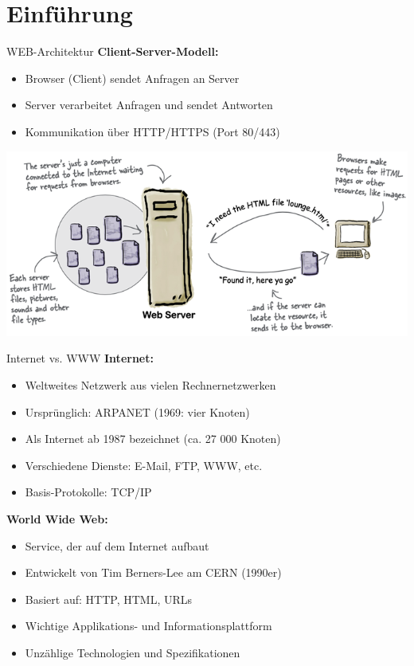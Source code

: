 \section{Einführung}

\begin{definition}{WEB-Architektur}
    \textbf{Client-Server-Modell:}
    \begin{itemize}
        \item Browser (Client) sendet Anfragen an Server
        \item Server verarbeitet Anfragen und sendet Antworten
        \item Kommunikation über HTTP/HTTPS (Port 80/443)
    \end{itemize}
    \includegraphics[width=0.8\linewidth]{images/web_architektur.png}
\end{definition}

\begin{concept}{Internet vs. WWW}
    \textbf{Internet:}
    \begin{itemize}
        \item Weltweites Netzwerk aus vielen Rechnernetzwerken
        \item Ursprünglich: ARPANET (1969: vier Knoten)
        \item Als Internet ab 1987 bezeichnet (ca. 27 000 Knoten)
        \item Verschiedene Dienste: E-Mail, FTP, WWW, etc.
        \item Basis-Protokolle: TCP/IP
    \end{itemize}
    
    \textbf{World Wide Web:}
    \begin{itemize}
        \item Service, der auf dem Internet aufbaut
        \item Entwickelt von Tim Berners-Lee am CERN (1990er)
        \item Basiert auf: HTTP, HTML, URLs
        \item Wichtige Applikations- und Informationsplattform
        \item Unzählige Technologien und Spezifikationen
    \end{itemize}
\end{concept}

